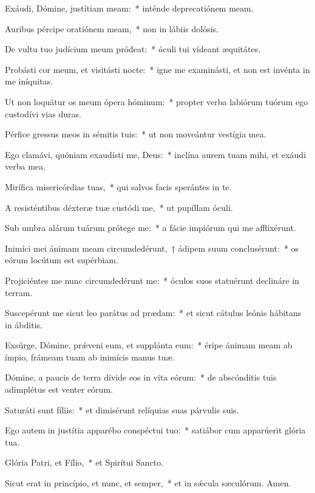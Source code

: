 \item Exáudi, Dómine, justítiam meam:~* inténde deprecatiónem meam.

\item Auribus pércipe oratiónem meam,~* non in lábiis dolósis.

\item De vultu tuo judícium meum pródeat:~* óculi tui vídeant æquitátes.

\item Probásti cor meum, et visitásti nocte:~* igne me examinásti, et non est invénta in me iníquitas.

\item Ut non loquátur os meum ópera hóminum:~* propter verba labiórum tuórum ego custodívi vias duras.

\item Pérfice gressus meos in sémitis tuis:~* ut non moveántur vestígia mea.

\item Ego clamávi, quóniam exaudísti me, Deus:~* inclína aurem tuam mihi, et exáudi verba mea.

\item Mirífica misericórdias tuas,~* qui salvos facis sperántes in te.

\item A resisténtibus déxteræ tuæ custódi me,~* ut pupíllam óculi.

\item Sub umbra alárum tuárum prótege me:~* a fácie impiórum qui me afflixérunt.

\item Inimíci mei ánimam meam circumdedérunt,~† ádipem suum conclusérunt:~* os eórum locútum est supérbiam.

\item Projiciéntes me nunc circumdedérunt me:~* óculos suos statuérunt declináre in terram.

\item Suscepérunt me sicut leo parátus ad prædam:~* et sicut cátulus leónis hábitans in ábditis.

\item Exsúrge, Dómine, prǽveni eum, et supplánta eum:~* éripe ánimam meam ab ímpio, frámeam tuam ab inimícis manus tuæ.

\item Dómine, a paucis de terra dívide eos in vita eórum:~* de abscónditis tuis adimplétus est venter eórum.

\item Saturáti sunt fíliis:~* et dimisérunt relíquias suas párvulis suis.

\item Ego autem in justítia apparébo conspéctui tuo:~* satiábor cum apparúerit glória tua.

\item Glória Patri, et Fílio,~* et Spirítui Sancto.

\item Sicut erat in princípio, et nunc, et semper,~* et in sǽcula sæculórum. Amen.

